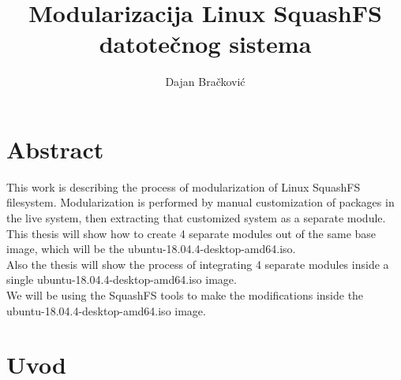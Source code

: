 \documentclass[12pt,vi]{mitthesis}
\begin{document}
\author{Dajan Bračković}
\title{Modularizacija Linux SquashFS datotečnog sistema}

\maketitle
\tableofcontents{}

\chapter*{Abstract}
\indent
This work is describing the process of modularization of Linux SquashFS filesystem. Modularization is performed by manual customization of packages in the live system, then extracting that customized system as a separate module.\\
\indent
This thesis will show how to create 4 separate modules out of the same base image, which will be the ubuntu-18.04.4-desktop-amd64.iso.\\
\indent
Also the thesis will show the process of integrating 4 separate modules inside a single ubuntu-18.04.4-desktop-amd64.iso image.\\
\indent
We will be using the SquashFS tools to make the modifications inside the ubuntu-18.04.4-desktop-amd64.iso image.

\chapter*{Uvod}
\end{document}
